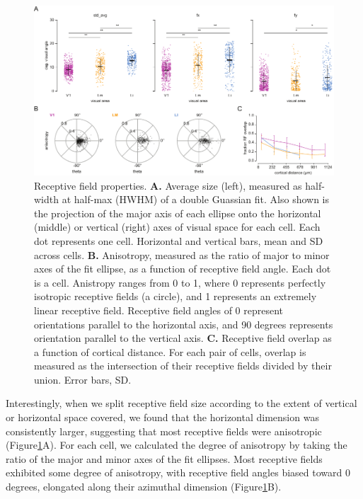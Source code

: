 \begin{figure}[t!]
    \includegraphics[width=\textwidth]{figures/chapter_3/fig_3-5_rf_aggregate/fig_3-5_rf_aggregate.pdf}
    \vspace{.1in}
    \caption[Receptive field properties]{Receptive field properties. 
    \textbf{A.} Average size (left), measured as half-width at half-max (HWHM) of a double Guassian fit. Also shown is the projection of the major axis of each ellipse onto the horizontal (middle) or vertical (right) axes of visual space for each cell. Each dot represents one cell. Horizontal and vertical bars, mean and SD across cells. 
    \textbf{B.} Anisotropy, measured as the ratio of major to minor axes of the fit ellipse, as a function of receptive field angle. Each dot is a cell. Anistropy ranges from 0 to 1, where 0 represents perfectly isotropic receptive fields (a circle), and 1 represents an extremely linear receptive field. Receptive field angles of 0 represent orientations parallel to the horizontal axis, and 90 degrees represents orientation parallel to the vertical axis.
    \textbf{C.} Receptive field overlap as a function of cortical distance. For each pair of cells, overlap is measured as the intersection of their receptive fields divided by their union. Error bars, SD.  
    \label{fig:rf_aggregate}}
\end{figure}

Interestingly, when we split receptive field size according to the extent of vertical or horizontal space covered, we found that the horizontal dimension was consistently larger, suggesting that most receptive fields were anisotropic (Figure\ref{fig:rf_aggregate}A). For each cell, we calculated the degree of anisotropy by taking the ratio of the major and minor axes of the fit ellipses. Most receptive fields exhibited some degree of anisotropy, with receptive field angles biased toward 0 degrees, elongated along their azimuthal dimension (Figure\ref{fig:rf_aggregate}B). 

